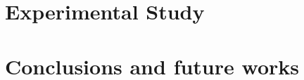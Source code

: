 \section{Experimental Study}
\label{sec:Experimental}


\section{Conclusions and future works}
\label{sec:Conclusion}


%
%

